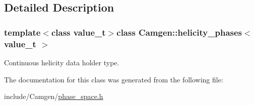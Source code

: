 \subsection{Detailed Description}
\subsubsection*{template$<$class value\+\_\+t$>$class Camgen\+::helicity\+\_\+phases$<$ value\+\_\+t $>$}

Continuous helicity data holder type. 

The documentation for this class was generated from the following file\+:\begin{DoxyCompactItemize}
\item 
include/\+Camgen/\hyperlink{a00718}{phase\+\_\+space.\+h}\end{DoxyCompactItemize}
